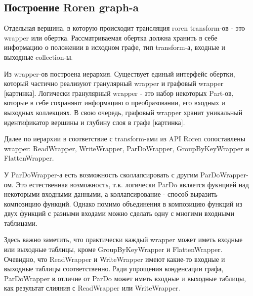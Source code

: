 \subsection{Построение Roren graph-a}

Отдельная вершина, в которую происходит трансляция roren transform-ов - это wrapper или обертка. Рассматриваемая обертка должна хранить в себе информацию о положении в исходном графе, тип transform-а, входные и выходные collection-ы.

Из wrapper-ов построена иерархия. Существует единый интерфейс обертки, который частично реализуют гранулярный wrapper и графовый wrapper [картинка]. Логически гранулярный wrapper - это набор некоторых Part-ов, которые в себе сохраняют информацию о преобразовании, его входных и выходных коллекциях. В свою очередь, графовый wrapper хранит уникальный идентификатор вершины и глубину слоя в графе [картинка].

Далее по иерархии в соответствие с transform-ами из API Roren сопоставлены wrapper: ReadWrapper, WriteWrapper, ParDoWrapper, GroupByKeyWrapper и FlattenWrapper.

У ParDoWrapper-а есть возможность сколлапсировать с другим ParDoWrapper-ом. Это естественная возможность, т.к. логически ParDo является фукнцией над некоторыми входными данными, а коллапсирование - способ выразить композицию функций. Однако помимо объединения в композицию функций из двух функций с разными входами можно сделать одну с многими входными таблицами.

Здесь важно заметить, что практически каждый wrapper может иметь входные или выходные таблицы, кроме GroupByKeyWrapper и FlattenWrapper. Очевидно, что ReadWrapper и WriteWrapper имеют какие-то входные и выходные таблицы соответственно. Ради упрощения конденсации графа, ParDoWrapper в отличие от ParDo может иметь входные и выходные таблицы, как результат слияния с ReadWrapper или WriteWrapper.
